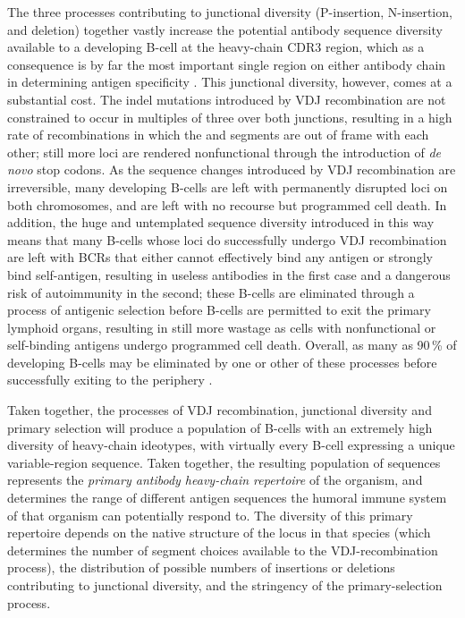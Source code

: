 The three processes contributing to junctional diversity (P-insertion, N-insertion, and deletion) together vastly increase the potential antibody sequence diversity available to a developing B-cell at the heavy-chain CDR3 region, which as a consequence is by far the most important single region on either antibody chain in determining antigen specificity \parencite{shirai1999h3}. This junctional diversity, however, comes at a substantial cost. The indel mutations introduced by VDJ recombination are not constrained to occur in multiples of three over both junctions, resulting in a high rate of recombinations in which the \vh and \jh segments are out of frame with each other; still more loci are rendered nonfunctional through the introduction of \textit{de novo} stop codons. As the sequence changes introduced by VDJ recombination are irreversible, many developing B-cells are left with permanently disrupted \igh{} loci on both chromosomes, and are left with no recourse but programmed cell death. In addition, the huge and untemplated sequence diversity introduced in this way means that many B-cells whose \igh{} loci do successfully undergo VDJ recombination are left with BCRs that either cannot effectively bind any antigen or strongly bind self-antigen, resulting in useless antibodies in the first case and a dangerous risk of autoimmunity in the second; these B-cells are eliminated through a process of antigenic selection before \naive B-cells are permitted to exit the primary lymphoid organs, resulting in still more wastage as cells with nonfunctional or self-binding antigens undergo programmed cell death. Overall, as many as 90\,\% of developing B-cells may be eliminated by one or other of these processes before successfully exiting to the periphery \parencite{kogut2012bcells}.  

Taken together, the processes of VDJ recombination, junctional diversity and primary selection will produce a population of \naive B-cells with an extremely high diversity of heavy-chain ideotypes, with virtually every \naive B-cell expressing a unique variable-region sequence. Taken together, the resulting population of sequences represents the \textit{primary antibody heavy-chain repertoire} of the organism, and determines the range of different antigen sequences the humoral immune system of that organism can potentially respond to. The diversity of this primary repertoire depends on the native structure of the \igh{} locus in that species (which determines the number of segment choices available to the VDJ-recombination process), the distribution of possible numbers of insertions or deletions contributing to junctional diversity, and the stringency of the primary-selection process.

